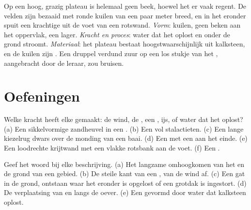 \begin{example}
Op een hoog, grazig plateau is helemaal geen beek, hoewel het er vaak
regent. De velden zijn bezaaid met ronde kuilen van een paar meter breed,
en in het  eronder spuit een krachtige  uit de voet van een
rotswand. \emph{Vorm}: kuilen, geen beken aan het oppervlak, een 
lager. \emph{Kracht en proces}: water dat het  oplost en onder de
grond stroomt. \emph{Materiaal}: het plateau bestaat hoogstwaarschijnlijk
uit kalksteen, en de kuilen zijn . Een druppel verdund zuur op een
los stukje van het , aangebracht door de leraar, zou bruisen.
\end{example}

\section{Oefeningen}

\begin{exercise}[$\star$]\label{exo:g9:landforms:1}
Welke kracht heeft elke  gemaakt: de wind, de , een , ijs,
of water dat het  oplost? (a) Een sikkelvormige zandheuvel in een
. (b) Een  vol stalactieten. (c) Een lange kiezelrug dwars over
de monding van een baai. (d) Een  met een  aan het einde. (e) Een
loodrechte krijtwand met een vlakke rotsbank aan de voet. (f) Een .
\end{exercise}

\begin{exercise}[$\star$]\label{exo:g9:landforms:2}
Geef het woord bij elke beschrijving. (a) Het langzame omhoogkomen van het
 en de grond van een gebied. (b) De steile kant van een , van
de wind af. (c) Een gat in de grond, ontstaan waar het  eronder is
opgelost of een grotdak is ingestort. (d) De verplaatsing van  en
 langs de oever. (e) Een  gevormd door water dat kalksteen
oplost.
\end{exercise}

